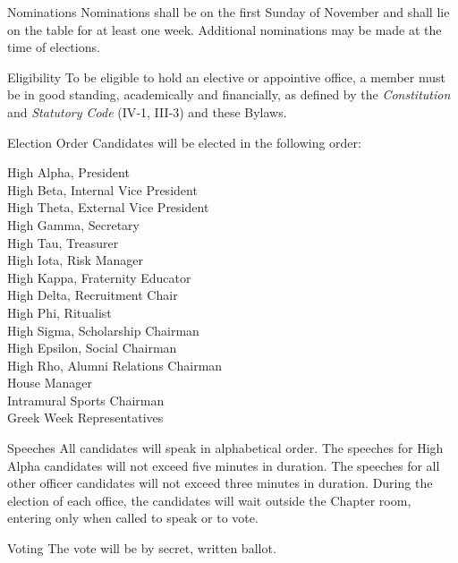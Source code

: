 \documentclass{article}
\begin{document}
\begin{subsubsectionList}
  \item {\titleStyle Nominations\titleSuffix}
  Nominations shall be on the first Sunday of November and shall lie on the
  table for at least one week. Additional nominations may be made at the time of
  elections.

  \item {\titleStyle Eligibility\titleSuffix}
  To be eligible to hold an elective or appointive office, a member must be in
  good standing, academically and financially, as defined by the
  \emph{Constitution} and \emph{Statutory Code} (IV‑1, III‑3) and these Bylaws.

  \item {\titleStyle Election Order\titleSuffix}
  Candidates will be elected in the following order:

  High Alpha, President\\
  High Beta, Internal Vice President\\
  High Theta, External Vice President\\
  High Gamma, Secretary\\
  High Tau, Treasurer\\
  High Iota, Risk Manager\\
  High Kappa, Fraternity Educator\\
  High Delta, Recruitment Chair\\
  High Phi, Ritualist\\
  High Sigma, Scholarship Chairman\\
  High Epsilon, Social Chairman\\
  High Rho, Alumni Relations Chairman\\
  House Manager\\
  Intramural Sports Chairman\\
  Greek Week Representatives

  \item {\titleStyle Speeches\titleSuffix}
  All candidates will speak in alphabetical order. The speeches for High Alpha
  candidates will not exceed five minutes in duration. The speeches for all
  other officer candidates will not exceed three minutes in duration. During the
  election of each office, the candidates will wait outside the Chapter room,
  entering only when called to speak or to vote.

  \item {\titleStyle Voting\titleSuffix}
  The vote will be by secret, written ballot.


\end{subsubsectionList}
\end{document}
